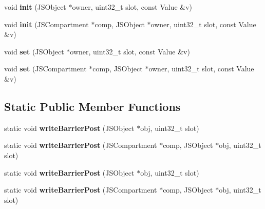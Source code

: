 \begin{DoxyCompactItemize}
\item 
\hypertarget{classjs_1_1_heap_slot_a3fa6582df922df07325f2a136c7d0312}{void {\bfseries init} (J\-S\-Object $\ast$owner, uint32\-\_\-t slot, const Value \&v)}\label{classjs_1_1_heap_slot_a3fa6582df922df07325f2a136c7d0312}

\item 
\hypertarget{classjs_1_1_heap_slot_ad600343e01468808115e977e1e5a40a1}{void {\bfseries init} (J\-S\-Compartment $\ast$comp, J\-S\-Object $\ast$owner, uint32\-\_\-t slot, const Value \&v)}\label{classjs_1_1_heap_slot_ad600343e01468808115e977e1e5a40a1}

\item 
\hypertarget{classjs_1_1_heap_slot_abfbe173966984c3dace40e97486f9a81}{void {\bfseries set} (J\-S\-Object $\ast$owner, uint32\-\_\-t slot, const Value \&v)}\label{classjs_1_1_heap_slot_abfbe173966984c3dace40e97486f9a81}

\item 
\hypertarget{classjs_1_1_heap_slot_a9745854e3abc10e23925dbb750031337}{void {\bfseries set} (J\-S\-Compartment $\ast$comp, J\-S\-Object $\ast$owner, uint32\-\_\-t slot, const Value \&v)}\label{classjs_1_1_heap_slot_a9745854e3abc10e23925dbb750031337}

\end{DoxyCompactItemize}
\subsection*{Static Public Member Functions}
\begin{DoxyCompactItemize}
\item 
\hypertarget{classjs_1_1_heap_slot_a4578bcb73ba010c850f8271234aa51fa}{static void {\bfseries write\-Barrier\-Post} (J\-S\-Object $\ast$obj, uint32\-\_\-t slot)}\label{classjs_1_1_heap_slot_a4578bcb73ba010c850f8271234aa51fa}

\item 
\hypertarget{classjs_1_1_heap_slot_ad9442844abf7a4bee5bd8ff2206d109a}{static void {\bfseries write\-Barrier\-Post} (J\-S\-Compartment $\ast$comp, J\-S\-Object $\ast$obj, uint32\-\_\-t slot)}\label{classjs_1_1_heap_slot_ad9442844abf7a4bee5bd8ff2206d109a}

\item 
\hypertarget{classjs_1_1_heap_slot_a4578bcb73ba010c850f8271234aa51fa}{static void {\bfseries write\-Barrier\-Post} (J\-S\-Object $\ast$obj, uint32\-\_\-t slot)}\label{classjs_1_1_heap_slot_a4578bcb73ba010c850f8271234aa51fa}

\item 
\hypertarget{classjs_1_1_heap_slot_ad9442844abf7a4bee5bd8ff2206d109a}{static void {\bfseries write\-Barrier\-Post} (J\-S\-Compartment $\ast$comp, J\-S\-Object $\ast$obj, uint32\-\_\-t slot)}\label{classjs_1_1_heap_slot_ad9442844abf7a4bee5bd8ff2206d109a}

\end{DoxyCompactItemize}


